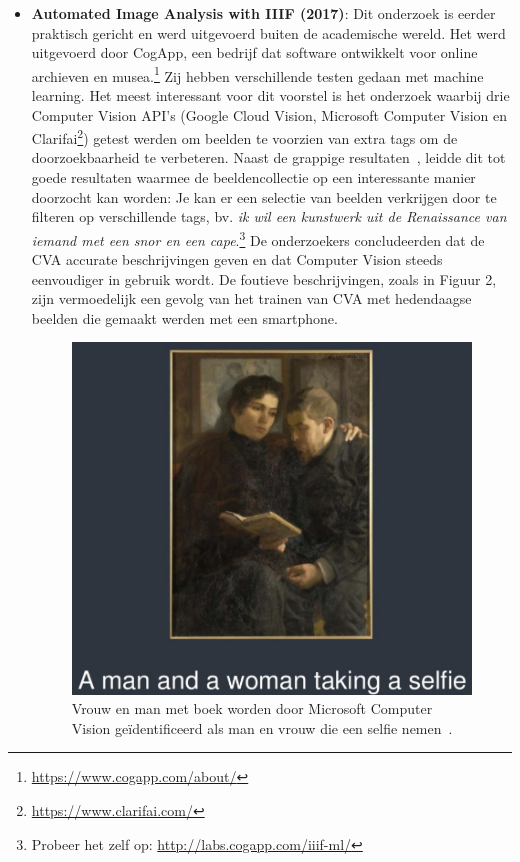\begin{itemize}
	\item \textbf{Automated Image Analysis with IIIF (2017)}: Dit onderzoek is eerder praktisch gericht en werd uitgevoerd buiten de academische wereld. Het werd uitgevoerd door CogApp, een bedrijf dat software ontwikkelt voor online archieven en musea.\footnote{\url{https://www.cogapp.com/about/}} Zij hebben verschillende testen gedaan met machine learning. Het meest interessant voor dit voorstel is het onderzoek waarbij drie Computer Vision API's (Google Cloud Vision, Microsoft Computer Vision en Clarifai\footnote{\url{https://www.clarifai.com/}}) getest werden om beelden te voorzien van extra tags om de doorzoekbaarheid te verbeteren. Naast de grappige resultaten~\autocite{Roddis2018}, leidde dit tot goede resultaten waarmee de beeldencollectie op een interessante manier doorzocht kan worden: Je kan er een selectie van beelden verkrijgen door te filteren op verschillende tags, bv. \emph{ik wil een kunstwerk uit de Renaissance van iemand met een snor en een cape}.\footnote{Probeer het zelf op: \url{http://labs.cogapp.com/iiif-ml/}} De onderzoekers concludeerden dat de CVA accurate beschrijvingen geven en dat Computer Vision steeds eenvoudiger in gebruik wordt. De foutieve beschrijvingen, zoals in Figuur 2, zijn vermoedelijk een gevolg van het trainen van CVA met hedendaagse beelden die gemaakt werden met een smartphone.~\autocite{Hindle2017}

	\begin{figure}[h]
		\caption[Voorbeeld van een foute tagline door Microsoft Computer Vision]{Vrouw en man met boek worden door Microsoft Computer Vision ge\"{i}dentificeerd als man en vrouw die een selfie nemen~\autocite{Roddis2018}.}
		\centering
		\includegraphics[width=\linewidth]{../voorstel/pictures/roddis_grappig_2}
	\end{figure}

\end{itemize}

